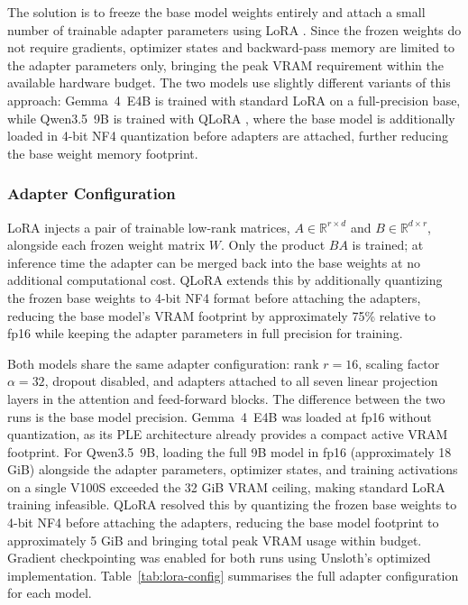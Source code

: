 \vspace{1em}

The solution is to freeze the base model weights entirely and attach a small number of trainable adapter parameters using \ac{LoRA} \cite{peft2024}. Since the frozen weights do not require gradients, optimizer states and backward-pass memory are limited to the adapter parameters only, bringing the peak \ac{VRAM} requirement within the available hardware budget. The two models use slightly different variants of this approach: Gemma~4~E4B is trained with standard \ac{LoRA} on a full-precision base, while Qwen3.5~9B is trained with \ac{QLoRA} \cite{peft2024}, where the base model is additionally loaded in 4-bit NF4 quantization before adapters are attached, further reducing the base weight memory footprint.

\subsubsection{Adapter Configuration}

\ac{LoRA} injects a pair of trainable low-rank matrices, $A \in \mathbb{R}^{r \times d}$ and $B \in \mathbb{R}^{d \times r}$, alongside each frozen weight matrix $W$. Only the product $BA$ is trained; at inference time the adapter can be merged back into the base weights at no additional computational cost. \ac{QLoRA} extends this by additionally quantizing the frozen base weights to 4-bit NF4 format before attaching the adapters, reducing the base model's \ac{VRAM} footprint by approximately 75\% relative to fp16 while keeping the adapter parameters in full precision for training.

\vspace{1em}

Both models share the same adapter configuration: rank $r = 16$, scaling factor $\alpha = 32$, dropout disabled, and adapters attached to all seven linear projection layers in the attention and feed-forward blocks. The difference between the two runs is the base model precision. Gemma~4~E4B was loaded at fp16 without quantization, as its \ac{PLE} architecture already provides a compact active \ac{VRAM} footprint. For Qwen3.5~9B, loading the full 9B model in fp16 (approximately 18 GiB) alongside the adapter parameters, optimizer states, and training activations on a single V100S exceeded the 32 GiB \ac{VRAM} ceiling, making standard \ac{LoRA} training infeasible. \ac{QLoRA} resolved this by quantizing the frozen base weights to 4-bit NF4 before attaching the adapters, reducing the base model footprint to approximately 5 GiB and bringing total peak \ac{VRAM} usage within budget. Gradient checkpointing was enabled for both runs using Unsloth's \cite{unsloth2024} optimized implementation. Table~\ref{tab:lora-config} summarises the full adapter configuration for each model.


